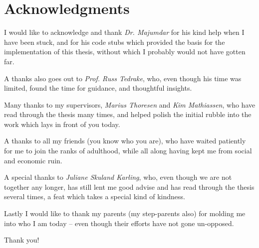\chapter{Acknowledgments}

\noindent \textsf{I} would like to acknowledge and thank \textit{Dr.
  Majumdar} for his kind help when I have been stuck, and for his code stubs
which provided the basis for the implementation of this thesis, without which I
probably would not have gotten far.

\vspace{1em}

\noindent \textsf{A} thanks also goes out to \textit{Prof. Russ
  Tedrake}, who, even though his time was limited, found the time for guidance,
and thoughtful insights.

\vspace{1em}

\noindent \textsf{M}any thanks to my supervisors, \textit{Marius
  Thoresen} and \textit{Kim Mathiassen}, who have read through the thesis many
times, and helped polish the initial rubble into the work which lays in front of
you today.

\vspace{1em}

\noindent \textsf{A} thanks to all my friends (you know who you are),
who have waited patiently for me to join the ranks of adulthood, while all along
having kept me from social and economic ruin.

\vspace{1em}

\noindent \textsf{A} special thanks to \textit{Juliane Skuland
  Karling}, who, even though we are not together any longer, has still lent me
good advise and has read through the thesis several times, a feat which takes a
special kind of kindness.

\vspace{1em}

\noindent \textsf{L}astly I would like to thank my parents (my
step-parents also) for molding me into who I am today -- even though their
efforts have not gone un-opposed. \\[2\onelineskip]
{
  \centering \textsf{Thank you!}\par
}
